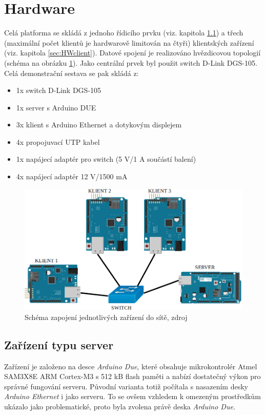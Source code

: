 \section{Hardware}
Celá platforma se skládá z jednoho řídicího prvku (viz. kapitola \ref{sec:HWserver}) a třech (maximální počet klientů je hardwarově limitován na čtyři) klientských zařízení (viz. kapitola \ref{sec:HWclient}). Datové spojení je realizováno hvězdicovou topologií (schéma na obrázku \ref{fig:schema_net}). Jako centrální prvek byl použit switch D-Link DGS-105.
Celá demonstrační sestava se pak skládá z:
\begin{itemize}
  \item 1x switch D-Link DGS-105
  \item 1x server s Arduino DUE
  \item 3x klient s Arduino Ethernet a dotykovým displejem
  \item 4x propojuvací UTP kabel
  \item 1x napájecí adaptér pro switch (5 V/1 A součástí balení)
  \item 4x napájecí adaptér 12 V/1500 mA
\end{itemize}

\begin{figure}[hbtp]
  \centering
  \includegraphics[width=12cm]{img/schema_net.png}
  \caption{\label{fig:schema_net} Schéma zapojení jednotlivých zařízení do sítě, zdroj \cite{fig_ArdEthernet, fig_ArdEthShield, fig_switchIco, fig_ArdDue}}
\end{figure}

\subsection{Zařízení typu server}
\label{sec:HWserver}
Zařízení je založeno na desce \textit{Arduino Due}, které obsahuje mikrokontrolér Atmel SAM3X8E ARM Cortex-M3 s 512 kB flash paměti a nabízí dostatečný výkon pro správné fungování serveru. Původní varianta totiž počítala s nasazením desky \textit{Arduino Ethernet} i jako serveru. To se ovšem vzhledem k omezeným prostředkům ukázalo jako problematické, proto byla zvolena právě deska \textit{Arduino Due}.


